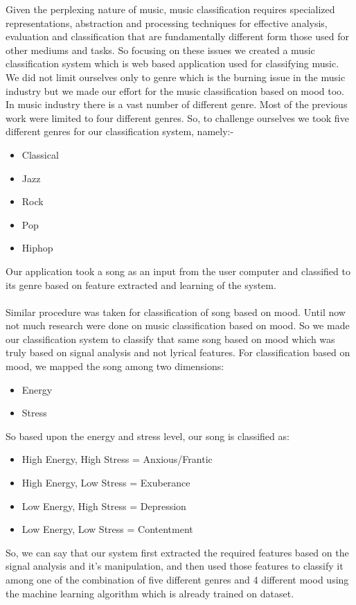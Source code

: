Given the perplexing nature of music, music classification requires specialized representations, abstraction and processing techniques for effective
analysis, evaluation and classification that are fundamentally different form those used for other mediums and tasks. So focusing on these issues
we created a music classification system which is web based application used for classifying music. We did not limit ourselves only to genre which is
the burning issue in the music industry but we made our effort for the music classification based on mood too. In music industry there is a vast
number of different genre. Most of the previous work were limited to four different genres. So, to challenge ourselves we took five different genres
for our classification system, namely:-
\begin{itemize}
        \item Classical
        \item Jazz
        \item Rock
        \item Pop
        \item Hiphop
\end{itemize}
Our application took a song as an input from the user computer and classified to its genre based on feature extracted and learning of the system.\\ \\ Similar procedure was taken for classification of song based on mood. Until now not much research were done on music classification based on mood.
So we made our classification system to classify that same song based on mood which was truly based on signal analysis and not lyrical features.
For classification based on mood, we mapped the song among two dimensions: 
\begin{itemize}
        \item Energy
        \item Stress
\end{itemize}
So based upon the energy and stress level, our song is classified as:
\begin{itemize}
        \item High Energy, High Stress = Anxious/Frantic
        \item High Energy, Low Stress = Exuberance
        \item Low Energy, High Stress = Depression
        \item Low Energy, Low Stress = Contentment
\end{itemize}
So, we can say that our system first extracted the required features based on the signal analysis and it's manipulation, and then used 
those features to classify it among one of the combination of five different genres and 4  different mood using the machine learning algorithm
which is already trained on dataset.\\


